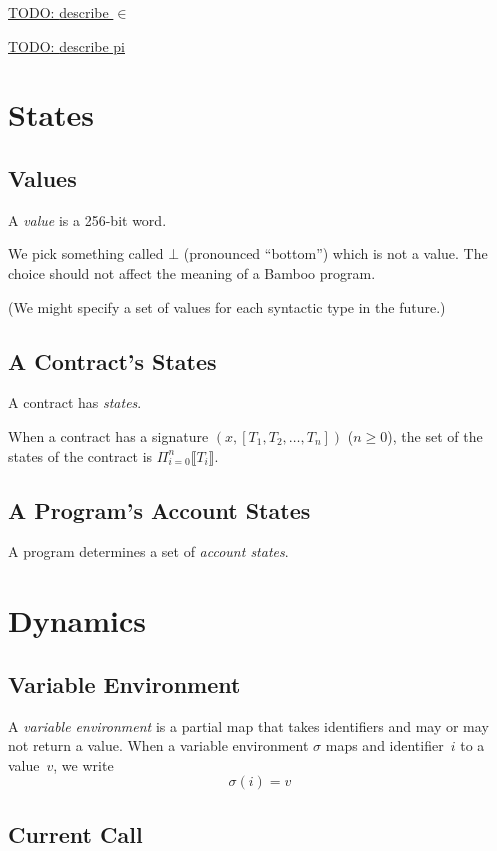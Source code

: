 \documentclass{book}
\newcommand{\todo}[1]{\underline{TODO: {#1}}}
\newcommand{\sem}[1]{\llbracket{#1}\rrbracket}
\begin{document}
\todo{describe $\in$}

\todo{describe pi}

\section{States}

\subsection{Values}

A \textit{value} is a 256-bit word.

We pick something called $\bot$ (pronounced ``bottom'') which is not a value.  The choice should not affect the meaning of a Bamboo program.

(We might specify a set of values for each syntactic type in the future.)

\subsection{A Contract's States}
A contract has \textit{states}.

When a contract has a signature $(x, [T_1, T_2, \ldots, T_n])$ ($n \ge 0$),
the set of the states of the contract is
$\Pi_{i = 0}^{n} \sem{T_i}$.

\subsection{A Program's Account States}
A program determines a set of \textit{account states}.

\section{Dynamics}

\subsection{Variable Environment}

A \textit{variable environment} is a partial map that takes identifiers and may or may not return a value.  When a variable environment $\sigma$ maps and identifier~$i$ to a value~$v$, we write
\[
\sigma(i) = v
\]

\subsection{Current Call}
\end{document}
